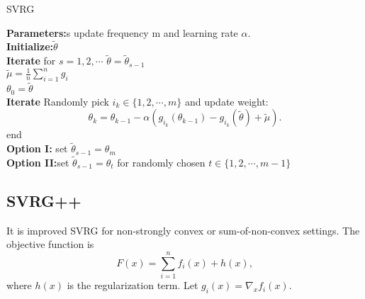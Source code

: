 \documentclass[11pt]{article} %
\begin{document}
\begin{algorithm}[t]
\caption{SVRG}
\textbf{Parameters:}s update frequency m and learning rate $\alpha$.\\
\textbf{Initialize:}$\tilde{\theta}$\\
\textbf{Iterate} for $s = 1,2,\cdots $
    $\tilde{\theta}={\tilde{\theta}_{s-1}}$\\
    $\tilde{\mu}=\frac{1}{n}\sum_{i=1}^{n} g_i $\\
    ${\theta}_{0}=\tilde{\theta} $\\
    \textbf{Iterate} Randomly pick $i_k \in \{1,2,\cdots, m\}$ and update weight: $${\theta}_k={\theta}_{k-1}-\alpha(g_{i_k}({\theta}_{k-1})-g_{i_k}(\tilde{\theta})+\tilde{\mu}).$$
  end\\
 \textbf{Option I:} set ${\tilde{\theta}}_{s-1}={\theta}_m$\\
 \textbf{Option II:}set  ${\tilde{\theta}}_{s-1}={\theta}_t$ for randomly chosen $t\in\{1,2,\cdots,m-1\}$

\end{algorithm}
\subsection{SVRG++}
It is improved SVRG for non-strongly convex or sum-of-non-convex settings.%
The objective function is $$F(x)=\sum _{i=1}^{n}f_{i}(x)+h(x),$$where $h(x)$ is the regularization term.
Let $g_i(x)={\nabla}_{x} f_i(x)$.
\end{document}
